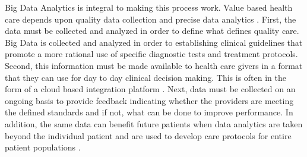 \documentclass[sigconf]{acmart}
\begin{document}
Big Data Analytics is integral to making this process work. Value based health care depends upon quality data collection and precise data analytics \cite{www-google-liason}.  First, the data must be collected and analyzed in order to define what defines quality care. Big Data is collected and analyzed in order to establishing clinical guidelines that promote a more rational use of specific diagnostic tests and treatment protocols.  Second, this information must be made available to health care givers in a format that they can use for day to day clinical decision making. This is often in the form of a cloud based integration platform \cite{www-google-liason}.  Next, data must be collected on an ongoing basis to provide feedback indicating whether  the providers are meeting the defined standards and if not, what can be done to improve performance. In addition, the same data can benefit future patients when data analytics are taken beyond the individual patient and are used to develop care protocols for entire patient populations \cite{www-google-liason}. 
\end{document}
